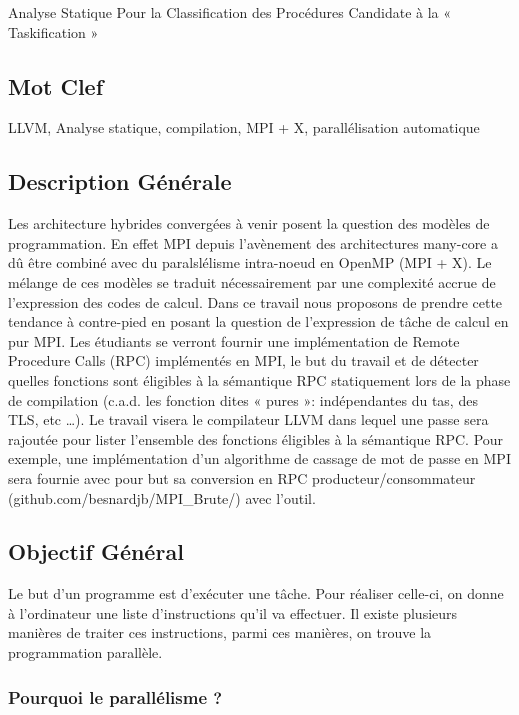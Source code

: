 \documentclass[12pt,titlepage]{article}
\begin{document}
Analyse Statique Pour la Classification des Procédures Candidate à la « Taskification »


\subsection{Mot Clef}

LLVM, Analyse statique, compilation, MPI + X, parallélisation automatique


\subsection{Description Générale}

Les architecture hybrides convergées à venir posent la question des modèles de programmation. En effet MPI depuis l’avènement des architectures many-core a dû être combiné avec du paralslélisme intra-noeud en OpenMP (MPI + X). Le mélange de ces modèles se traduit nécessairement par une complexité accrue de l’expression des codes de calcul. Dans ce travail nous proposons de prendre cette tendance à contre-pied en posant la question de l’expression de tâche de calcul en pur MPI. Les étudiants se verront fournir une implémentation de Remote Procedure Calls (RPC) implémentés en MPI, le but du travail et de détecter quelles fonctions sont éligibles à la sémantique RPC statiquement lors de la phase de compilation (c.a.d. les fonction dites « pures »: indépendantes du tas, des TLS, etc …). Le travail visera le compilateur LLVM dans lequel une passe sera rajoutée pour lister l’ensemble des fonctions éligibles à la sémantique RPC. Pour exemple, une implémentation d’un algorithme de cassage de mot de passe en MPI sera fournie avec pour but sa conversion en RPC producteur/consommateur (github.com/besnardjb/MPI\_Brute/) avec l’outil.


 \subsection{Objectif Général}

Le but d'un programme est d'exécuter  une tâche. Pour réaliser celle-ci, on donne à l'ordinateur une liste d'instructions qu'il va effectuer. Il existe plusieurs manières de traiter ces instructions, parmi ces manières, on trouve la programmation parallèle.

\subsubsection{Pourquoi le parallélisme ?}
\end{document}
